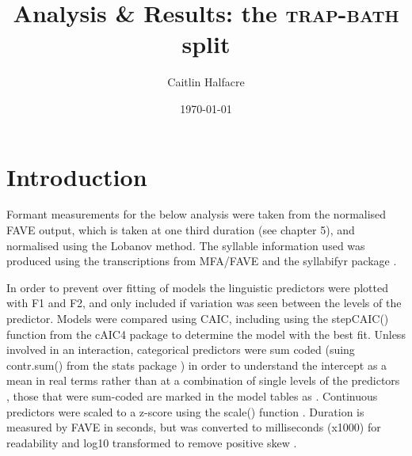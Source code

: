 \documentclass[../../../00.FullDoc/tex/APRReport-year4]{subfiles}
\title{Analysis \& Results: the \textsc{trap}-\textsc{bath} split}
\author{Caitlin Halfacre}
\date{\today}
\begin{document}
	
	\newcommand{\onlyinsubfile}[1]{#1}
	\newcommand{\notinsubfile}[1]{}
	\maketitle
	\pagebreak
	\tableofcontents
	\onehalfspacing
	\pagestyle{scrheadings}
	
\section{Introduction}
Formant measurements for the below analysis were taken from the normalised FAVE \citep{FAVE} output, which is taken at one third duration (see chapter \onlyinsubfile{5}\notinsubfile{\ref{ch:Methodology}}), and normalised using the Lobanov method. The syllable information used was produced using the transcriptions from MFA/FAVE and the syllabifyr package \citep{syllabifyr}.

In order to prevent over fitting of models the linguistic predictors were plotted with F1 and F2, and only included if variation was seen between the levels of the predictor. Models were compared using CAIC, including using the stepCAIC() function from the cAIC4 package \citep{cAIC4} to determine the model with the best fit. Unless involved in an interaction, categorical predictors were sum coded (suing contr.sum() from the stats package \citealt{RCoreTeam2021}) in order to understand the intercept as a mean in real terms rather than at a combination of single levels of the predictors \cite{Winter2019}, those that were sum-coded are marked in the model tables as . Continuous predictors were scaled to a z-score using the scale() function \citep{RCoreTeam2021}. Duration is measured by FAVE in seconds, but was converted to milliseconds (x1000) for readability and log10 transformed to remove positive skew \cite{Winter2019}.
\end{document}
